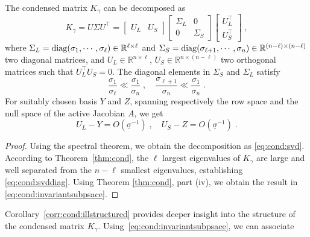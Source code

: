 \begin{corollary}
  \label{corr:cond:illstructured}
  The condensed matrix $K_\gamma$ can be decomposed as
  \begin{equation}
    \label{eq:cond:svd}
    K_\gamma = U \Sigma U^\top = \begin{bmatrix} U_L & U_S \end{bmatrix}
    \begin{bmatrix}
      \Sigma_L & 0 \\ 0 & \Sigma_S
    \end{bmatrix}
    \begin{bmatrix}
      U_L^\top \\ U_S^\top
    \end{bmatrix}
    \; ,
  \end{equation}
  where $\Sigma_L = \operatorname{diag}(\sigma_1, \cdots, \sigma_\ell) \in \mathbb{R}^{\ell \times \ell}$ and $\Sigma_S  = \operatorname{diag}(\sigma_{\ell+1}, \cdots, \sigma_n)\in \mathbb{R}^{(n-\ell) \times (n-\ell)}$
  two diagonal matrices, and $U_L \in \mathbb{R}^{n \times \ell}$,
  $U_S \in \mathbb{R}^{n \times (n - \ell)}$ two
  orthogonal matrices such that $U_L^\top U_S = 0$.
  The diagonal elements in $\Sigma_S$ and $\Sigma_L$ satisfy
  \begin{equation}
    \label{eq:cond:svddiag}
    \frac{\sigma_1}{\sigma_\ell} \ll \frac{\sigma_1}{\sigma_n} \; , \quad
    \frac{\sigma_{\ell +1}}{\sigma_{n}} \ll \frac{\sigma_1}{\sigma_n} \; .
  \end{equation}
  For suitably chosen basis $Y$ and $Z$,
  spanning respectively the row space and the null space of
  the active Jacobian $A$, we get
  \begin{equation}
    \label{eq:cond:invariantsubpsace}
    U_L - Y = O(\underline{\sigma}^{-1}) \; , \quad
    U_S - Z = O(\underline{\sigma}^{-1}) \; .
  \end{equation}
\end{corollary}
\begin{proof}
  Using the spectral theorem, we obtain the decomposition as \eqref{eq:cond:svd}.
  According to Theorem~\ref{thm:cond}, the $\ell$ largest eigenvalues of $K_\gamma$ are large
  and well separated from the $n - \ell$ smallest eigenvalues,
  establishing \eqref{eq:cond:svddiag}.
  Using Theorem \ref{thm:cond}, part (iv), we obtain the result
  in \eqref{eq:cond:invariantsubpsace}.
\end{proof}
Corollary~\ref{corr:cond:illstructured} provides deeper insight into the structure
of the condensed matrix $K_\gamma$.
Using~\eqref{eq:cond:invariantsubpsace}, we can associate
